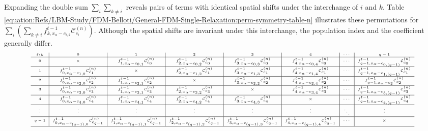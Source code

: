 \documentclass[letterpaper,10pt,english,openany,oneside]{jupyterBook}
\begin{document}
\sphinxAtStartPar
Expanding the double sum \(\sum_i \sum_{k\neq i}\) reveals pairs of
terms with identical spatial shifts under the interchange of \(i\) and \(k\).
Table \eqref{equation:Refs/LBM-Study/FDM-Belloti/General-FDM-Single-Relaxation:perm-symmetry-table-n} illustrates these permutations for
\(\sum_i \left( \sum_{k\neq i}
f_{k,x_{\alpha}-c_{i,k}}^{t-1}\mathcal{C}_{c_i}^{(n)} \right)\).
Although the spatial shifts are invariant under this interchange,
the population index and the coefficient generally differ.
\begin{equation}\label{equation:Refs/LBM-Study/FDM-Belloti/General-FDM-Single-Relaxation:perm-symmetry-table-n}
\begin{split}\tiny
\begin{array}{c|c|c|c|c|c|c|c}
i \backslash k & 0 & 1 & 2 & 3 & 4 & \cdots & q-1 \\
\hline
0
& \times
& f_{1,x_{\alpha}-c_{0,1}}^{t-1}\mathcal{C}_{c_0}^{(n)}
& f_{2,x_{\alpha}-c_{0,2}}^{t-1}\mathcal{C}_{c_0}^{(n)}
& f_{3,x_{\alpha}-c_{0,3}}^{t-1}\mathcal{C}_{c_0}^{(n)}
& f_{4,x_{\alpha}-c_{0,4}}^{t-1}\mathcal{C}_{c_0}^{(n)}
& \cdots
& f_{q-1,x_{\alpha}-c_{0,(q-1)}}^{t-1}\mathcal{C}_{c_0}^{(n)} \\
\hline
1
& f_{0,x_{\alpha}-c_{1,0}}^{t-1}\mathcal{C}_{c_1}^{(n)}
& \times
& f_{2,x_{\alpha}-c_{1,2}}^{t-1}\mathcal{C}_{c_1}^{(n)}
& f_{3,x_{\alpha}-c_{1,3}}^{t-1}\mathcal{C}_{c_1}^{(n)}
& f_{4,x_{\alpha}-c_{1,4}}^{t-1}\mathcal{C}_{c_1}^{(n)}
& \cdots
& f_{q-1,x_{\alpha}-c_{1,(q-1)}}^{t-1}\mathcal{C}_{c_1}^{(n)} \\
\hline
2
& f_{0,x_{\alpha}-c_{2,0}}^{t-1}\mathcal{C}_{c_2}^{(n)}
& f_{1,x_{\alpha}-c_{2,1}}^{t-1}\mathcal{C}_{c_2}^{(n)}
& \times
& f_{3,x_{\alpha}-c_{2,3}}^{t-1}\mathcal{C}_{c_2}^{(n)}
& f_{4,x_{\alpha}-c_{2,4}}^{t-1}\mathcal{C}_{c_2}^{(n)}
& \cdots
& f_{q-1,x_{\alpha}-c_{2}}^{t-1}\mathcal{C}_{c_2}^{(n)} \\
\hline
3
& f_{0,x_{\alpha}-c_{3,0}}^{t-1}\mathcal{C}_{c_3}^{(n)}
& f_{1,x_{\alpha}-c_{3,1}}^{t-1}\mathcal{C}_{c_3}^{(n)}
& f_{2,x_{\alpha}-c_{3,2}}^{t-1}\mathcal{C}_{c_3}^{(n)}
& \times
& f_{4,x_{\alpha}-c_{3,4}}^{t-1}\mathcal{C}_{c_3}^{(n)}
& \cdots
& f_{q-1,x_{\alpha}-c_{3,(q-1)}}^{t-1}\mathcal{C}_{c_3}^{(n)} \\
\hline
4
& f_{0,x_{\alpha}-c_{4,0}}^{t-1}\mathcal{C}_{c_4}^{(n)}
& f_{1,x_{\alpha}-c_{4,1}}^{t-1}\mathcal{C}_{c_4}^{(n)}
& f_{2,x_{\alpha}-c_{4,2}}^{t-1}\mathcal{C}_{c_4}^{(n)}
& f_{3,x_{\alpha}-c_{4,3}}^{t-1}\mathcal{C}_{c_4}^{(n)}
& \times
& \cdots
& f_{q-1,x_{\alpha}-c_{4,(q-1)}}^{t-1}\mathcal{C}_{c_4}^{(n)} \\
\hline
\vdots
& \vdots
& \vdots
& \vdots
& \vdots
& \vdots
& \ddots
& \vdots \\
\hline
q-1
& f_{0,x_{\alpha}-c_{(q-1),0}}^{t-1}\mathcal{C}_{c_{q-1}}^{(n)}
& f_{1,x_{\alpha}-c_{(q-1),1}}^{t-1}\mathcal{C}_{c_{q-1}}^{(n)}
& f_{2,x_{\alpha}-c_{(q-1),2}}^{t-1}\mathcal{C}_{c_{q-1}}^{(n)}
& f_{3,x_{\alpha}-c_{(q-1),3}}^{t-1}\mathcal{C}_{c_{q-1}}^{(n)}
& f_{4,x_{\alpha}-c_{(q-1),4}}^{t-1}\mathcal{C}_{c_{q-1}}^{(n)}
& \cdots
& \times \\
\hline
\end{array}
\end{split}
\end{equation}
\end{document}

